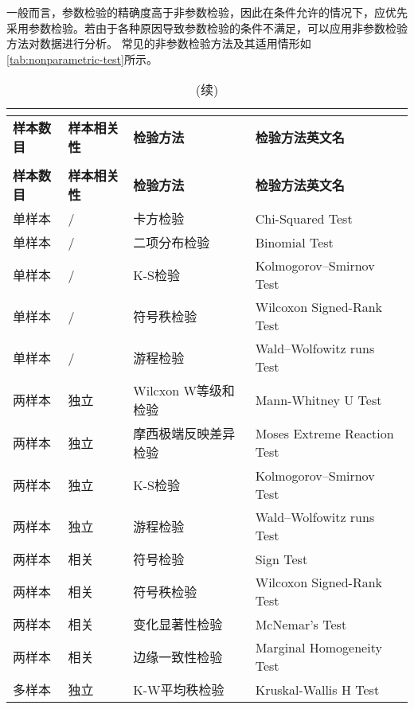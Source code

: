 一般而言，参数检验的精确度高于非参数检验，因此在条件允许的情况下，应优先采用参数检验。若由于各种原因导致参数检验的条件不满足，可以应用非参数检验方法对数据进行分析。
常见的非参数检验方法及其适用情形如\autoref{tab:nonparametric-test}所示。
\begin{center}
      \begin{longtable}{m{1.8cm}<{\centering}m{2.5cm}<{\centering}m{5cm}<{\centering}m{6cm}<{\centering}}
		\caption{常见的非参数检验方法}\\
		\label{tab:nonparametric-test}\\
		\toprule
            \textbf{样本数目}&\textbf{样本相关性}&\textbf{检验方法}&\textbf{检验方法英文名}\\
            \midrule
            \endfirsthead
            \caption[]{(续)}\\
            \toprule
            \textbf{样本数目}&\textbf{样本相关性}&\textbf{检验方法}&\textbf{检验方法英文名}\\
            \midrule
            \endhead 
            \hline
            \endfoot
            \bottomrule
            \endlastfoot
            单样本   & /     & 卡方检验  & Chi-Squared Test \\
            单样本   & /     & 二项分布检验 & Binomial Test \\
            单样本   & /     & K-S检验 & Kolmogorov–Smirnov Test \\
            单样本   & /     & 符号秩检验 & Wilcoxon Signed-Rank Test \\
            单样本   & /     & 游程检验  & Wald–Wolfowitz runs Test \\
            两样本   & 独立    & Wilcxon W等级和检验 & Mann-Whitney U Test \\
            两样本   & 独立    & 摩西极端反映差异检验 & Moses Extreme Reaction Test \\
            两样本   & 独立    & K-S检验 & Kolmogorov–Smirnov Test \\
            两样本   & 独立    & 游程检验  & Wald–Wolfowitz runs Test \\
            两样本   & 相关    & 符号检验  & Sign Test \\
            两样本   & 相关    & 符号秩检验 & Wilcoxon Signed-Rank Test \\
            两样本   & 相关    & 变化显著性检验 & McNemar's Test \\
            两样本   & 相关    & 边缘一致性检验 & Marginal Homogeneity Test \\
            多样本   & 独立    & K-W平均秩检验 & Kruskal-Wallis H Test \\

\end{longtable}
\end{center}
